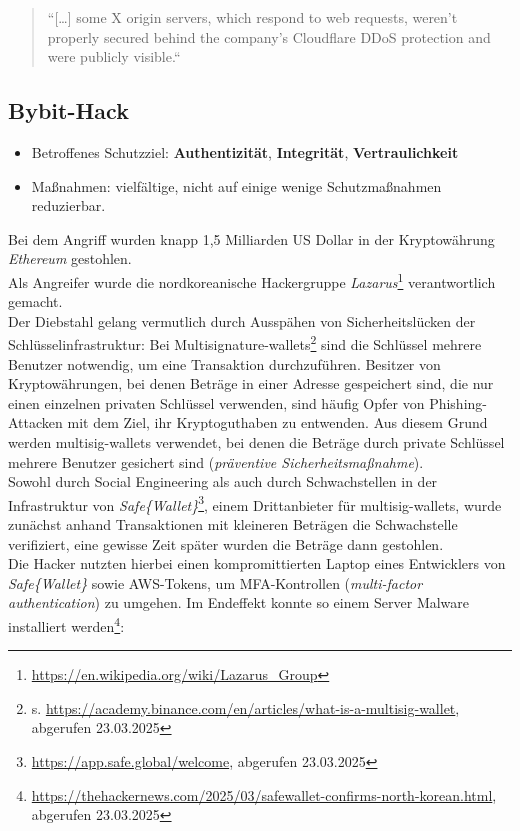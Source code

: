 \blockquote[]{
``[\ldots] some X origin servers, which respond to web requests, weren't properly secured behind the company's Cloudflare DDoS protection and were publicly visible.``
}

\subsection*{Bybit-Hack}

\begin{itemize}
    \item Betroffenes Schutzziel: \textbf{Authentizität}, \textbf{Integrität}, \textbf{Vertraulichkeit}
    \item Maßnahmen: vielfältige, nicht auf einige wenige Schutzmaßnahmen reduzierbar.
\end{itemize}

\noindent
Bei dem Angriff wurden knapp 1,5 Milliarden US Dollar in der Kryptowährung \textit{Ethereum} gestohlen.\\
Als Angreifer wurde die nordkoreanische Hackergruppe \textit{Lazarus}\footnote{
    \url{https://en.wikipedia.org/wiki/Lazarus_Group}
} verantwortlich gemacht.\\

\noindent
Der Diebstahl gelang vermutlich durch Ausspähen von Sicherheitslücken der Schlüsselinfrastruktur: Bei Multisignature-wallets\footnote{
s. \url{https://academy.binance.com/en/articles/what-is-a-multisig-wallet}, abgerufen 23.03.2025
} sind die Schlüssel mehrere Benutzer notwendig, um eine Transaktion durchzuführen.
Besitzer von Kryptowährungen, bei denen Beträge in einer Adresse gespeichert sind, die nur einen einzelnen privaten Schlüssel verwenden, sind häufig Opfer von Phishing-Attacken mit dem Ziel, ihr Kryptoguthaben zu entwenden.
Aus diesem Grund werden multisig-wallets verwendet, bei denen die Beträge durch private Schlüssel mehrere Benutzer gesichert sind (\textit{präventive Sicherheitsmaßnahme}).
\\
Sowohl durch Social Engineering als auch durch Schwachstellen in der Infrastruktur  von \textit{Safe\{Wallet\}}\footnote{
    \url{https://app.safe.global/welcome}, abgerufen 23.03.2025
}, einem Drittanbieter für multisig-wallets, wurde zunächst anhand Transaktionen mit kleineren Beträgen die Schwachstelle verifiziert, eine gewisse Zeit später wurden die Beträge dann gestohlen.\\
Die Hacker nutzten hierbei einen kompromittierten Laptop eines Entwicklers von \textit{Safe\{Wallet\}} sowie AWS-Tokens, um MFA-Kontrollen (\textit{multi-factor authentication}) zu umgehen.
Im Endeffekt konnte so einem Server Malware installiert werden\footnote{
\url{https://thehackernews.com/2025/03/safewallet-confirms-north-korean.html}, abgerufen 23.03.2025
}:

